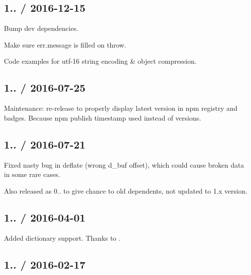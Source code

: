 \subsection*{1.. / 2016-\/12-\/15 }


\begin{DoxyItemize}
\item Bump dev dependencies.
\item Make sure {\ttfamily err.\+message} is filled on throw.
\item Code examples for utf-\/16 string encoding \& object compression.
\end{DoxyItemize}

\subsection*{1.. / 2016-\/07-\/25 }


\begin{DoxyItemize}
\item Maintenance\+: re-\/release to properly display latest version in npm registry and badges. Because {\ttfamily npm publish} timestamp used instead of versions.
\end{DoxyItemize}

\subsection*{1.. / 2016-\/07-\/21 }


\begin{DoxyItemize}
\item Fixed nasty bug in deflate (wrong {\ttfamily d\+\_\+buf} offset), which could cause broken data in some rare cases.
\item Also released as 0.. to give chance to old dependents, not updated to 1.\+x version.
\end{DoxyItemize}

\subsection*{1.. / 2016-\/04-\/01 }


\begin{DoxyItemize}
\item Added dictionary support. Thanks to .
\end{DoxyItemize}

\subsection*{1.. / 2016-\/02-\/17 }



